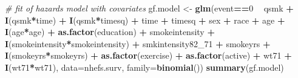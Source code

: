 \documentclass[
  10pt,
]{book}
\newenvironment{Shaded}{\begin{snugshade}}{\end{snugshade}}
\newcommand{\CommentTok}[1]{\textcolor[rgb]{0.56,0.35,0.01}{\textit{#1}}}
\newcommand{\DataTypeTok}[1]{\textcolor[rgb]{0.13,0.29,0.53}{#1}}
\newcommand{\DecValTok}[1]{\textcolor[rgb]{0.00,0.00,0.81}{#1}}
\newcommand{\KeywordTok}[1]{\textcolor[rgb]{0.13,0.29,0.53}{\textbf{#1}}}
\newcommand{\NormalTok}[1]{#1}
\newcommand{\OperatorTok}[1]{\textcolor[rgb]{0.81,0.36,0.00}{\textbf{#1}}}
\newcommand{\StringTok}[1]{\textcolor[rgb]{0.31,0.60,0.02}{#1}}
\begin{document}
\begin{Shaded}
\begin{Highlighting}[]
\CommentTok{# fit of hazards model with covariates}
\NormalTok{gf.model <-}\StringTok{ }\KeywordTok{glm}\NormalTok{(event}\OperatorTok{==}\DecValTok{0} \OperatorTok{~}\StringTok{ }\NormalTok{qsmk }\OperatorTok{+}\StringTok{ }\KeywordTok{I}\NormalTok{(qsmk}\OperatorTok{*}\NormalTok{time) }\OperatorTok{+}\StringTok{ }\KeywordTok{I}\NormalTok{(qsmk}\OperatorTok{*}\NormalTok{timesq)}
                \OperatorTok{+}\StringTok{ }\NormalTok{time }\OperatorTok{+}\StringTok{ }\NormalTok{timesq }\OperatorTok{+}\StringTok{ }\NormalTok{sex }\OperatorTok{+}\StringTok{ }\NormalTok{race }\OperatorTok{+}\StringTok{ }\NormalTok{age }\OperatorTok{+}\StringTok{ }\KeywordTok{I}\NormalTok{(age}\OperatorTok{*}\NormalTok{age)}
                \OperatorTok{+}\StringTok{ }\KeywordTok{as.factor}\NormalTok{(education) }\OperatorTok{+}\StringTok{ }\NormalTok{smokeintensity }
                \OperatorTok{+}\StringTok{ }\KeywordTok{I}\NormalTok{(smokeintensity}\OperatorTok{*}\NormalTok{smokeintensity) }\OperatorTok{+}\StringTok{ }\NormalTok{smkintensity82_}\DecValTok{71} 
                \OperatorTok{+}\StringTok{ }\NormalTok{smokeyrs }\OperatorTok{+}\StringTok{ }\KeywordTok{I}\NormalTok{(smokeyrs}\OperatorTok{*}\NormalTok{smokeyrs) }\OperatorTok{+}\StringTok{ }\KeywordTok{as.factor}\NormalTok{(exercise) }
                \OperatorTok{+}\StringTok{ }\KeywordTok{as.factor}\NormalTok{(active) }\OperatorTok{+}\StringTok{ }\NormalTok{wt71 }\OperatorTok{+}\StringTok{ }\KeywordTok{I}\NormalTok{(wt71}\OperatorTok{*}\NormalTok{wt71), }
                \DataTypeTok{data=}\NormalTok{nhefs.surv, }\DataTypeTok{family=}\KeywordTok{binomial}\NormalTok{())}
\KeywordTok{summary}\NormalTok{(gf.model)}
\end{Highlighting}
\end{Shaded}
\end{document}
